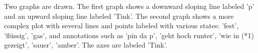 Two graphs are drawn. The first graph shows a downward sloping line labeled 'p' and an upward sloping line labeled 'Tink'. The second graph shows a more complex plot with several lines and points labeled with various states: 'fest', 'flüssig', 'gas', and annotations such as 'pin da p', 'geht hoch runter', 'wie in (*1) gezeigt', 'sauer', 'amber'. The axes are labeled 'Tink'.